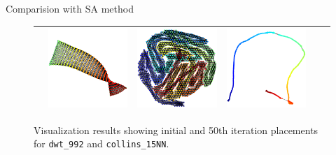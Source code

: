 \documentclass[dvipdfmx,13pt,aspectratio=169]{beamer}
\begin{document}
\begin{frame}{Comparision with SA method}
\begin{figure}[t]
\begin{tabular}{cccccc}
         & \includegraphics[width=0.15\columnwidth]{../main/circle/vis/dwt_992_CN-L-BFGS_50_last.png}
         & \includegraphics[width=0.15\columnwidth]{../main/circle/vis/collins_15NN_CN-L-BFGS_50_first.png}
         & \includegraphics[width=0.15\columnwidth]{../main/circle/vis/collins_15NN_CN-L-BFGS_50_last.png}                                                          \\
        \bottomrule
      \end{tabular}
      \caption{\small{Visualization results showing initial and 50th iteration placements for \texttt{dwt\_992} and \texttt{collins\_15NN}.}}
      \label{fig:CN_vs_SA}
    \end{figure}
  \end{frame}
\fi
\end{document}
